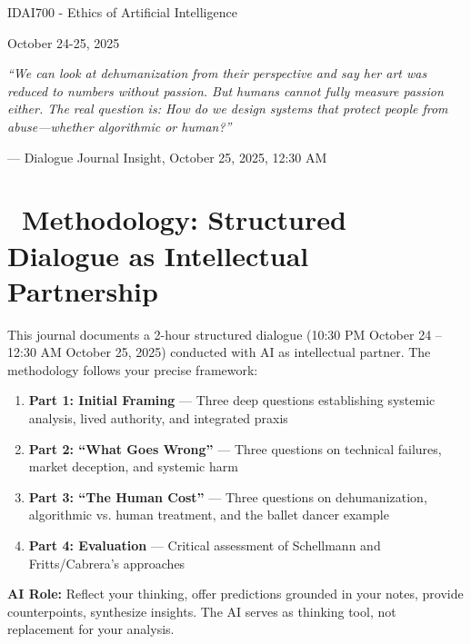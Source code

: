 \documentclass[12pt,letterpaper]{article}
\begin{document}
\begin{titlepage}
\vspace{0.5cm}

{\large IDAI700 - Ethics of Artificial Intelligence}

\vspace{1cm}

{\large October 24-25, 2025}

\vspace{2cm}

\textit{\color{softgray}``We can look at dehumanization from their perspective and say her art was reduced to numbers without passion. But humans cannot fully measure passion either. The real question is: How do we design systems that protect people from abuse—whether algorithmic or human?''}

\vspace{0.5cm}

{\small --- Dialogue Journal Insight, October 25, 2025, 12:30 AM}

\end{titlepage}

\newpage

\section*{\faComments\ Methodology: Structured Dialogue as Intellectual Partnership}

This journal documents a 2-hour structured dialogue (10:30 PM October 24 -- 12:30 AM October 25, 2025) conducted with AI as intellectual partner. The methodology follows your precise framework:

\begin{enumerate}[leftmargin=*]
    \item \textbf{Part 1: Initial Framing} — Three deep questions establishing systemic analysis, lived authority, and integrated praxis
    \item \textbf{Part 2: ``What Goes Wrong''} — Three questions on technical failures, market deception, and systemic harm
    \item \textbf{Part 3: ``The Human Cost''} — Three questions on dehumanization, algorithmic vs. human treatment, and the ballet dancer example
    \item \textbf{Part 4: Evaluation} — Critical assessment of Schellmann and Fritts/Cabrera's approaches
\end{enumerate}

\noindent
\textbf{AI Role:} Reflect your thinking, offer predictions grounded in your notes, provide counterpoints, synthesize insights. The AI serves as thinking tool, not replacement for your analysis.
\end{document}
